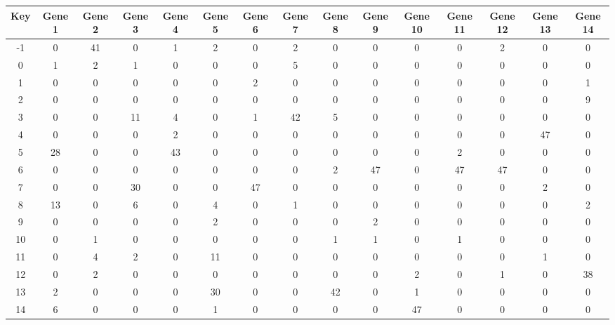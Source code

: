 \begin{tabular}{|c|c|c|c|c|c|c|c|c|c|c|c|c|c|c|}
\hline
Key & Gene 1 & Gene 2 & Gene 3 & Gene 4 & Gene 5 & Gene 6 & Gene 7 & Gene 8 & Gene 9 & Gene 10 & Gene 11 & Gene 12 & Gene 13 & Gene 14 \\
\hline
-1 & 0 & 41 & 0 & 1 & 2 & 0 & 2 & 0 & 0 & 0 & 0 & 2 & 0 & 0 \\
0 & 1 & 2 & 1 & 0 & 0 & 0 & 5 & 0 & 0 & 0 & 0 & 0 & 0 & 0 \\
1 & 0 & 0 & 0 & 0 & 0 & 2 & 0 & 0 & 0 & 0 & 0 & 0 & 0 & 1 \\
2 & 0 & 0 & 0 & 0 & 0 & 0 & 0 & 0 & 0 & 0 & 0 & 0 & 0 & 9 \\
3 & 0 & 0 & 11 & 4 & 0 & 1 & 42 & 5 & 0 & 0 & 0 & 0 & 0 & 0 \\
4 & 0 & 0 & 0 & 2 & 0 & 0 & 0 & 0 & 0 & 0 & 0 & 0 & 47 & 0 \\
5 & 28 & 0 & 0 & 43 & 0 & 0 & 0 & 0 & 0 & 0 & 2 & 0 & 0 & 0 \\
6 & 0 & 0 & 0 & 0 & 0 & 0 & 0 & 2 & 47 & 0 & 47 & 47 & 0 & 0 \\
7 & 0 & 0 & 30 & 0 & 0 & 47 & 0 & 0 & 0 & 0 & 0 & 0 & 2 & 0 \\
8 & 13 & 0 & 6 & 0 & 4 & 0 & 1 & 0 & 0 & 0 & 0 & 0 & 0 & 2 \\
9 & 0 & 0 & 0 & 0 & 2 & 0 & 0 & 0 & 2 & 0 & 0 & 0 & 0 & 0 \\
10 & 0 & 1 & 0 & 0 & 0 & 0 & 0 & 1 & 1 & 0 & 1 & 0 & 0 & 0 \\
11 & 0 & 4 & 2 & 0 & 11 & 0 & 0 & 0 & 0 & 0 & 0 & 0 & 1 & 0 \\
12 & 0 & 2 & 0 & 0 & 0 & 0 & 0 & 0 & 0 & 2 & 0 & 1 & 0 & 38 \\
13 & 2 & 0 & 0 & 0 & 30 & 0 & 0 & 42 & 0 & 1 & 0 & 0 & 0 & 0 \\
14 & 6 & 0 & 0 & 0 & 1 & 0 & 0 & 0 & 0 & 47 & 0 & 0 & 0 & 0 \\
\hline
\end{tabular}